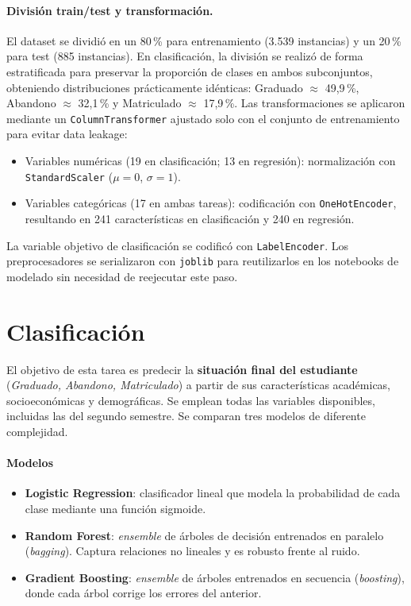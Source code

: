 \documentclass[11pt,letterpaper]{article}
\newcommand{\code}[1]{\texttt{#1}}
\begin{document}
\paragraph{División train/test y transformación.}
El dataset se dividió en un 80\,\% para entrenamiento (3.539 instancias) y un 20\,\% para test (885 instancias). En clasificación, la división se realizó de forma estratificada para preservar la proporción de clases en ambos subconjuntos, obteniendo distribuciones prácticamente idénticas: Graduado $\approx$ 49,9\,\%, Abandono $\approx$ 32,1\,\% y Matriculado $\approx$ 17,9\,\%. Las transformaciones se aplicaron mediante un \code{ColumnTransformer} ajustado solo con el conjunto de entrenamiento para evitar data leakage:
\begin{itemize}
\item Variables numéricas (19 en clasificación; 13 en regresión): normalización con \code{StandardScaler} ($\mu=0$, $\sigma=1$).
\item Variables categóricas (17 en ambas tareas): codificación con \code{OneHotEncoder}, resultando en 241 características en clasificación y 240 en regresión.
\end{itemize}
La variable objetivo de clasificación se codificó con \code{LabelEncoder}. Los preprocesadores se serializaron con \code{joblib} para reutilizarlos en los notebooks de modelado sin necesidad de reejecutar este paso.

\section{Clasificación}

El objetivo de esta tarea es predecir la \textbf{situación final del estudiante} (\emph{Graduado, Abandono, Matriculado}) a partir de sus características académicas, socioeconómicas y demográficas. Se emplean todas las variables disponibles, incluidas las del segundo semestre. Se comparan tres modelos de diferente complejidad.

\paragraph{Modelos}
\begin{itemize}
\item \textbf{Logistic Regression}: clasificador lineal que modela la probabilidad de cada clase mediante una función sigmoide.
\item \textbf{Random Forest}: \emph{ensemble} de árboles de decisión entrenados en paralelo (\emph{bagging}). Captura relaciones no lineales y es robusto frente al ruido.
\item \textbf{Gradient Boosting}: \emph{ensemble} de árboles entrenados en secuencia (\emph{boosting}), donde cada árbol corrige los errores del anterior.
\end{itemize}
\end{document}
